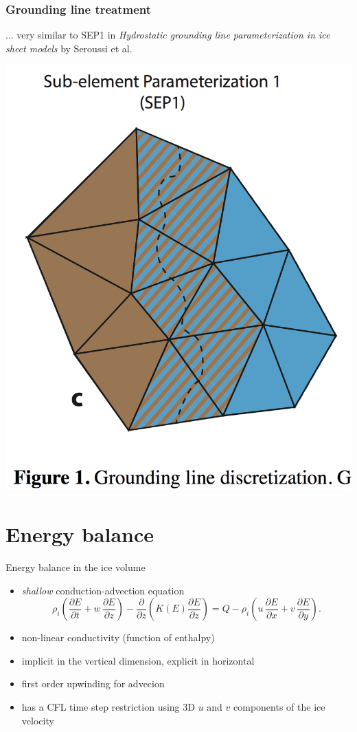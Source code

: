 \documentclass[hide notes,intlimits]{beamer}
\newcommand{\diff}[2]{\frac{\partial #1}{\partial #2}}
\begin{document}
\begin{frame}
  \frametitle{Grounding line treatment}

  ... very similar to SEP1 in \emph{Hydrostatic grounding line
    parameterization in ice sheet models} by Seroussi et al.

  \begin{center}
    \includegraphics[width=0.4\linewidth]{Seroussi-SEP1}
  \end{center}

\end{frame}

\section{Energy balance}
\label{sec:energy-balance}

\begin{frame}{Energy balance in the ice volume}
  \begin{itemize}
  \item \emph{shallow} conduction-advection equation
    \begin{equation}
      \label{eq:1}
  \rho_{i} \left( \diff{E}{t} + w\,\diff{E}{z} \right) - \diff{}{z}\left( K(E) \diff{E}{z} \right) = Q - \rho_{i} \left( u\,\diff{E}{x} + v\,\diff{E}{y} \right).
    \end{equation}
  \item non-linear conductivity (function of enthalpy)
  \item implicit in the vertical dimension, explicit in horizontal
  \item first order upwinding for advecion
  \item has a CFL time step restriction using 3D $u$ and $v$
    components of the ice velocity
  \end{itemize}
\end{frame}
\end{document}
